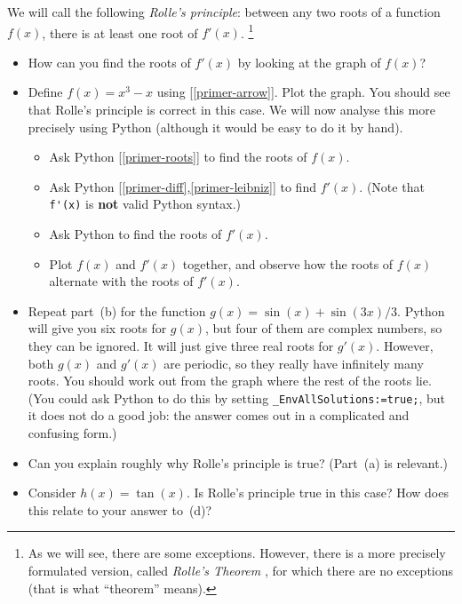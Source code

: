 \documentclass[a4paper,10pt]{amsbook}
\begin{document}
\begin{exercise}\label{ex-rolle}
 We will call the following \emph{Rolle's principle}: between any two
 roots of a function $f(x)$, there is at least one root of $f'(x)$. 
 \footnote{ As we will see, there are some exceptions.  However, there
   is a more precisely formulated version, called \emph{Rolle's
   Theorem} , for which there are no exceptions (that is what
   ``theorem'' means).  
 } 
 \begin{itemize}
  \item[(a)] How can you find the roots of $f'(x)$ by looking at the
   graph of $f(x)$? 
  \item[(b)] Define $f(x)=x^3-x$ using [\ref{primer-arrow}]. 
   Plot the graph.  You should see that Rolle's principle is
   correct in this case.  We will now analyse this more precisely using
   Python (although it would be easy to do it by hand). 
   \begin{itemize}
    \item Ask Python [\ref{primer-roots}] to find the roots of $f(x)$. 
    \item Ask Python [\ref{primer-diff},\ref{primer-leibniz}] to find
     $f'(x)$.  (Note that \verb~f'(x)~ is \textbf{not} valid
     Python syntax.) 
    \item Ask Python to find the roots of $f'(x)$. 
    \item Plot $f(x)$ and $f'(x)$ together, and observe how the roots
     of $f(x)$ alternate with the roots of $f'(x)$. 
   \end{itemize}
  \item[(c)] Repeat part~(b) for the function
   $g(x)=\sin(x)+\sin(3x)/3$.  Python will give you six roots for
   $g(x)$, but four of them are complex numbers, so they can be
   ignored.  It will just give three real roots for $g'(x)$.  However,
   both $g(x)$ and $g'(x)$ are periodic, so they really have
   infinitely many roots.  You should work out from the graph
   where the rest of the roots lie.  (You could ask Python to do this
   by setting \verb~_EnvAllSolutions:=true;~, but it does not do a
   good job: the answer comes out in a complicated and confusing
   form.) 
  \item[(d)] Can you explain roughly why Rolle's principle is true? 
   (Part~(a) is relevant.) 
  \item[(e)] Consider $h(x)=\tan(x)$.  Is Rolle's principle true in
   this case?  How does this relate to your answer to~(d)?  
 \end{itemize}
\end{exercise}
\end{document}
